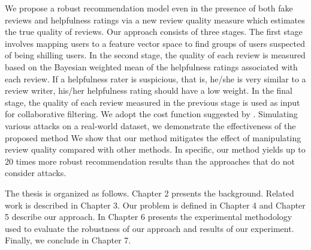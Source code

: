 \documentclass[master,english,final]{kaist-ucs}
\begin{document}
We propose a robust recommendation model even in the presence of both fake reviews and helpfulness ratings via a new review quality measure which estimates the true quality of reviews.
Our approach consists of three stages.
The first stage involves mapping users to a feature vector space to find groups of users suspected of being shilling users.
In the second stage, the quality of each review is measured based on the Bayesian weighted mean of the helpfulness ratings associated with each review.
If a helpfulness rater is suspicious, that is, he/she is very similar to a review writer, his/her helpfulness rating should have a low weight.
In the final stage, the quality of each review measured in the previous stage is used as input for collaborative filtering.
We adopt the cost function suggested by \cite{ImplicitCF,RQMF}.
Simulating various attacks on a real-world dataset, we demonstrate the effectiveness of the proposed method 
We show that our method mitigates the effect of manipulating review quality compared with other methods.
In specific, our method yields up to 20 times more robust recommendation results than the approaches that do not consider attacks.

The thesis is organized as follows.
Chapter 2 presents the background.
Related work is described in Chapter 3.
Our problem is defined in Chapter 4 and Chapter 5 describe our approach.
In Chapter 6 presents the experimental methodology used to evaluate the robustness of our approach and results of our experiment.
Finally, we conclude in Chapter 7.
\end{document}
